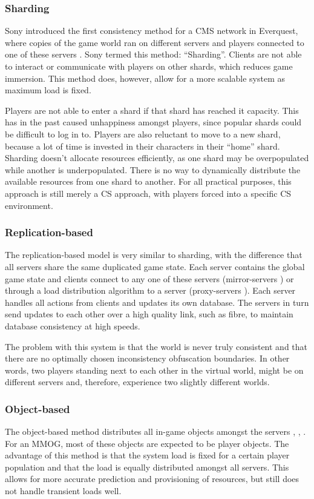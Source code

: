 \documentclass[10pt,a4paper,journal,cspaper,compsoc]{IEEEtran}
\begin{document}
\subsubsection{Sharding}
Sony introduced the first consistency method for a \ac{CMS} network in Everquest, where copies of the game world ran on different servers and players
connected to one of these servers \cite{engineering_everquest}. Sony termed this method: ``Sharding''. Clients are not able to interact or
communicate with players on other shards, which reduces game immersion. This method does, however, allow for a more scalable system as maximum load
is fixed.

Players are not able to enter a shard if that shard has reached it capacity. This has in the past caused unhappiness amongst players, since popular
shards could be difficult to log in to. Players are also reluctant to move to a new shard, because a lot of time is invested in their characters in
their ``home'' shard. Sharding doesn't allocate resources efficiently, as one shard may be overpopulated while another is underpopulated. There is no
way to dynamically distribute the available resources from one shard to another. For all practical purposes, this approach is still merely a \ac{CS}
approach, with players forced into a specific \ac{CS} environment.

\subsubsection{Replication-based}
The replication-based model is very similar to sharding, with the difference that all servers share the same duplicated game state. Each server
contains the global game state and clients connect to any one of these servers (mirror-servers \cite{mirrored_server}) or through a load distribution
algorithm to a server (proxy-servers \cite{proxy_server_dist}). Each server handles all actions from clients and updates its own database. The
servers in turn send updates to each other over a high quality link, such as fibre, to maintain database consistency at high speeds.

The problem with this system is that the world is never truly consistent and that there are no optimally chosen inconsistency obfuscation boundaries.
In other words, two players standing next to each other in the virtual world, might be on different servers and, therefore, experience two slightly
different worlds.

\subsubsection{Object-based}
The object-based method distributes all in-game objects amongst the servers \cite{object_based_consistency1}, \cite{object_based_consistency2},
\cite{object_based_consistency3}. For an MMOG, most of these objects are expected to be player objects. The advantage of this method is that the
system load is fixed for a certain player population and that the load is equally distributed amongst all servers. This allows for more accurate
prediction and provisioning of resources, but still does not handle transient loads well.
\end{document}
